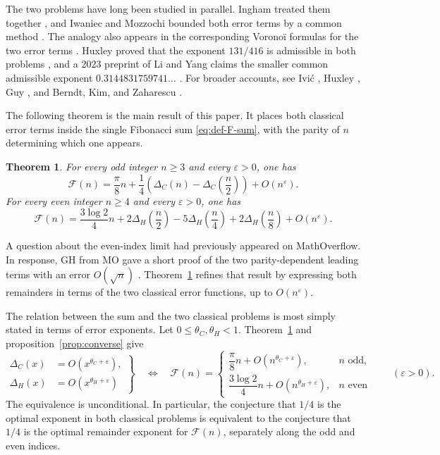 \documentclass[11pt]{article}
\newtheorem{theorem}{Theorem}[section]
\newcommand{\FF}{\mathcal F}
\newcommand{\eps}{\varepsilon}
\begin{document}
The two problems have long been studied in parallel. Ingham treated them
together \cite{Ingham}, and Iwaniec and Mozzochi bounded both error terms
by a common method \cite{IwaniecMozzochi}. The analogy also appears in the
corresponding Vorono\"i formulas for the two error terms \cite{Ingham,Ivic}.
Huxley proved that the exponent $131/416$ is admissible in both problems
\cite{Huxley}, and a 2023 preprint of Li and Yang claims the smaller common
admissible exponent
$0.3144831759741\ldots$ \cite{LiYang}. For broader accounts, see Ivi\'c
\cite{Ivic}, Huxley \cite{HuxleyBook,HuxleyMillennium}, Guy \cite{Guy}, and
Berndt, Kim, and Zaharescu \cite{BerndtKimZaharescu}. 

The following theorem is the main result of this paper. It places both
classical error terms inside the single Fibonacci sum
\eqref{eq:def-F-sum}, with the parity of $n$ determining which one appears.

\begin{theorem}\label{thm:main}
For every odd integer $n\geq 3$ and every $\eps>0$, one has
\begin{equation}\label{eq:odd-main}
 \FF(n)=\frac{\pi}{8}n
 +\frac14\left(\Delta_C(n)-\Delta_C\left(\frac n2\right)\right)
 +O(n^\eps).
\end{equation}
For every even integer $n\geq 4$ and every $\eps>0$, one has
\begin{equation}\label{eq:even-main}
 \FF(n)=\frac{3\log 2}{4}n
 +2\Delta_H\left(\frac n2\right)
 -5\Delta_H\left(\frac n4\right)
 +2\Delta_H\left(\frac n8\right)
 +O(n^\eps).
\end{equation}
\end{theorem}

A question about the even-index limit had previously appeared on
MathOverflow. In response, GH from MO gave a short proof of the two
parity-dependent leading terms with an error $O(\sqrt n)$ \cite{GHMO}.
Theorem~\ref{thm:main} refines that result by expressing both remainders in
terms of the two classical error functions, up to $O(n^\eps)$.

The relation between the sum and the two classical problems is most simply
stated in terms of error exponents. Let $0\leq\theta_C,\theta_H<1$.
Theorem~\ref{thm:main} and proposition~\ref{prop:converse} give
\begin{equation}\label{eq:exponent-equivalence}
 \left.
 \begin{aligned}
  \Delta_C(x)&=O(x^{\theta_C+\eps}),\\
  \Delta_H(x)&=O(x^{\theta_H+\eps})
 \end{aligned}
 \right\}
 \quad\Longleftrightarrow\quad
 \FF(n)=
 \begin{cases}
  \dfrac{\pi}{8}n+O(n^{\theta_C+\eps}),&n\text{ odd},\\[6pt]
  \dfrac{3\log 2}{4}n+O(n^{\theta_H+\eps}),&n\text{ even}
 \end{cases}
 \qquad(\eps>0).
\end{equation}
The equivalence is unconditional. In particular, the conjecture that
$1/4$ is the optimal exponent in both classical problems is equivalent
to the conjecture that $1/4$ is the optimal remainder exponent for
$\FF(n)$, separately along the odd and even indices.
\end{document}
